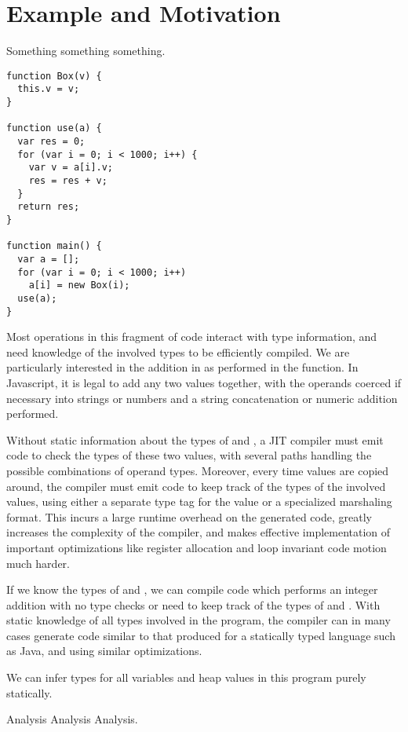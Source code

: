 
\section{Example and Motivation}

Something something something.

\begin{verbatim}
function Box(v) {
  this.v = v;
}

function use(a) {
  var res = 0;
  for (var i = 0; i < 1000; i++) {
    var v = a[i].v;
    res = res + v;
  }
  return res;
}

function main() {
  var a = [];
  for (var i = 0; i < 1000; i++)
    a[i] = new Box(i);
  use(a);
}
\end{verbatim}

Most operations in this fragment of code interact with type information,
and need knowledge of the involved types to be efficiently compiled.
We are particularly interested in the addition in
 as performed in the  function.
In Javascript, it is legal to add any two values together, with the
operands coerced if necessary into strings or numbers and a string
concatenation or numeric addition performed.

Without static information about the types of  and ,
a JIT compiler must emit code to check the types of these two values,
with several paths handling the possible combinations of
operand types.
Moreover, every time values are copied around, the compiler must emit
code to keep track of the types of the involved values, using either
a separate type tag for the value or a specialized marshaling format.
This incurs a large runtime overhead on the generated code,
greatly increases the complexity of the compiler,
and makes effective implementation of important optimizations like
register allocation and loop invariant code motion much harder.

If we know the types of  and , we can compile
code which performs an integer addition with no type checks or need
to keep track of the types of  and .
With static knowledge of all types involved in the program, the compiler can
in many cases generate code similar to that produced for a statically
typed language such as Java, and using similar optimizations.

We can infer types for all variables and heap values in this program
purely statically.

Analysis Analysis Analysis.

